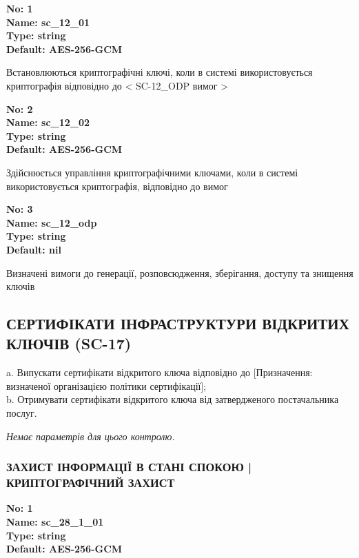 \documentclass{article}
\begin{document}
\vspace{10pt}
{\footnotesize\bfseries
No: 1\\
Name: sc\_\allowbreak{}12\_\allowbreak{}01\\
Type: string\\
Default: \textquotedbl{}AES-256-GCM\textquotedbl{}
}

{\footnotesize Встановлюються криптографічні ключі, коли в системі використовується криптографія відповідно до < SC-12\_\allowbreak{}ODP вимог >}


{\footnotesize\bfseries
No: 2\\
Name: sc\_\allowbreak{}12\_\allowbreak{}02\\
Type: string\\
Default: \textquotedbl{}AES-256-GCM\textquotedbl{}
}

{\footnotesize Здійснюється управління криптографічними ключами, коли в системі використовується криптографія, відповідно до вимог }


{\footnotesize\bfseries
No: 3\\
Name: sc\_\allowbreak{}12\_\allowbreak{}odp\\
Type: string\\
Default: nil
}

{\footnotesize Визначені вимоги до генерації, розповсюдження, зберігання, доступу та знищення ключів}




\subsection{СЕРТИФІКАТИ ІНФРАСТРУКТУРИ ВІДКРИТИХ КЛЮЧІВ (SC-17)}
a. Випускати сертифікати відкритого ключа відповідно до [Призначення: визначеної організацією політики сертифікації];\\ 
b. Отримувати сертифікати відкритого ключа від затвердженого постачальника послуг.

\vspace{10pt}
\textit{Немає параметрів для цього контролю.}
\vspace{10pt}


\subsubsection{ЗАХИСТ ІНФОРМАЦІЇ В СТАНІ СПОКОЮ | КРИПТОГРАФІЧНИЙ ЗАХИСТ}


\vspace{10pt}
{\footnotesize\bfseries
No: 1\\
Name: sc\_\allowbreak{}28\_\allowbreak{}1\_\allowbreak{}01\\
Type: string\\
Default: \textquotedbl{}AES-256-GCM\textquotedbl{}
}
\end{document}
